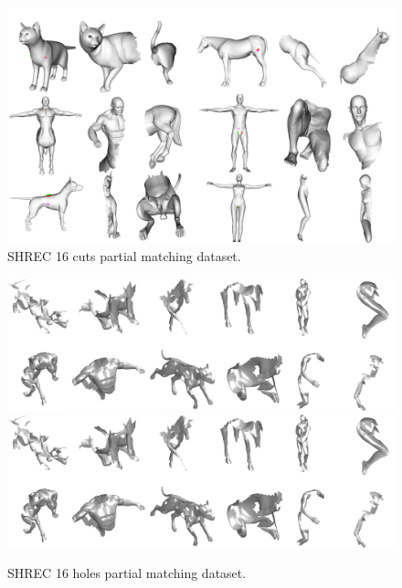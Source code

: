\documentclass[10pt,twocolumn,letterpaper]{article}
\begin{document}
\begin{figure}[htb]
	\centering
	\includegraphics[width=1\textwidth]{figures/Partial_matching_shrec.png}

	\caption{SHREC 16 cuts partial matching dataset.}
\end{figure}
\begin{figure}[htb]
	\centering
	\ifpdf
	\includegraphics[width=1\textwidth]{figures/Holes.png}
	\else
	\includegraphics[width=1\textwidth]{figures/Holes.png}
	\fi
	\caption{SHREC 16 holes partial matching dataset.}
\end{figure}
\end{document}
